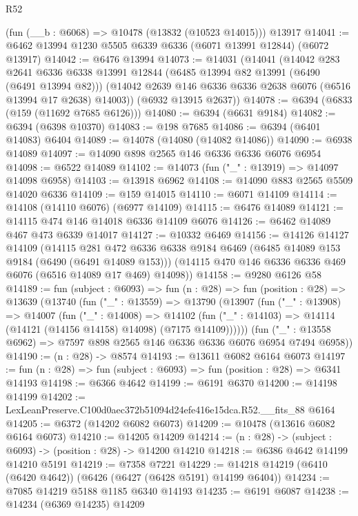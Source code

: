 \begin{lexlean}{R52}
\begin{coremodule}
    (fun (__b : @6068) => @10478 (@13832 (@10523 @14015)))
    @13917
@14041 := @6462 @13994 @1230 @5505 @6339 @6336 (@6071 @13991 @12844) (@6072 @13917)
@14042 := @6476 @13994
@14073 := @14031
    (@14041
      (@14042
        @283
        @2641
        @6336
        @6338
        @13991
        @12844
        (@6485 @13994 @82 @13991 (@6490 (@6491 @13994 @82)))
        (@14042 @2639 @146 @6336 @6336 @2638 @6076 (@6516 @13994 @17 @2638) @14003))
      (@6932 @13915 @2637))
@14078 := @6394 (@6833 (@159 (@11692 @7685 @6126)))
@14080 := @6394 (@6631 @9184)
@14082 := @6394 (@6398 @10370)
@14083 := @198 @7685
@14086 := @6394 (@6401 @14083) @6404
@14089 := @14078 (@14080 (@14082 @14086))
@14090 := @6938 @14089
@14097 := @14090 @898 @2565 @146 @6336 @6336 @6076 @6954
@14098 := @6522 @14089
@14102 := @14073 (fun ("_" : @13919) => @14097 @14098 @6958)
@14103 := @13918 @6962
@14108 := @14090 @883 @2565 @5509 @14020 @6336
@14109 := @159 @14015
@14110 := @6071 @14109
@14114 := @14108 (@14110 @6076) (@6977 @14109)
@14115 := @6476 @14089
@14121 := @14115 @474 @146 @14018 @6336 @14109 @6076
@14126 := @6462 @14089 @467 @473 @6339 @14017
@14127 := @10332 @6469
@14156 := @14126
    @14127
    @14109
    (@14115
      @281
      @472
      @6336
      @6338
      @9184
      @6469
      (@6485 @14089 @153 @9184 (@6490 (@6491 @14089 @153)))
      (@14115 @470 @146 @6336 @6336 @469 @6076 (@6516 @14089 @17 @469) @14098))
@14158 := @9280 @6126 @58
@14189 := fun (subject : @6093) =>
  fun (n : @28) =>
  fun (position : @28) =>
  @13639
    (@13740
      (fun ("_" : @13559) =>
      @13790
        (@13907
          (fun ("_" : @13908) =>
          @14007
            (fun ("_" : @14008) =>
            @14102 (fun ("_" : @14103) => @14114 (@14121 (@14156 @14158) @14098) (@7175 @14109))))))
      (fun ("_" : @13558 @6962) => @7597 @898 @2565 @146 @6336 @6336 @6076 @6954 @7494 @6958))
@14190 := (n : @28) -> @8574
@14193 := @13611 @6082 @6164 @6073
@14197 := fun (n : @28) => fun (subject : @6093) => fun (position : @28) => @6341 @14193
@14198 := @6366 @4642
@14199 := @6191 @6370
@14200 := @14198 @14199
@14202 := LexLeanPreserve.C100d0aec372b51094d24efe416e15dca.R52.__fits_88 @6164
@14205 := @6372 (@14202 @6082 @6073)
@14209 := @10478 (@13616 @6082 @6164 @6073)
@14210 := @14205 @14209
@14214 := (n : @28) -> (subject : @6093) -> (position : @28) -> @14200 @14210
@14218 := @6386 @4642 @14199 @14210 @5191
@14219 := @7358 @7221
@14229 := @14218 @14219 (@6410 (@6420 @4642)) (@6426 (@6427 (@6428 @5191) @14199 @6404))
@14234 := @7085 @14219 @5188 @1185 @6340 @14193
@14235 := @6191 @6087
@14238 := @14234 (@6369 @14235) @14209

\end{coremodule}
\end{lexlean}
